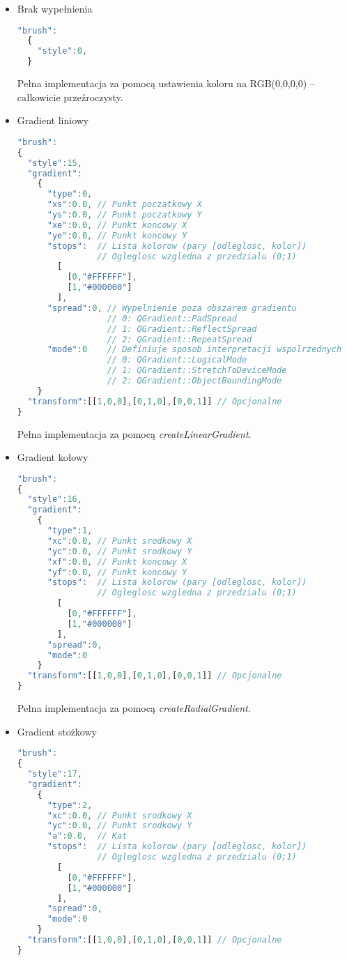 \begin{itemize}
\item Brak wypełnienia
\begin{lstlisting}[language=JavaScript,numbers=none]	    "brush":
  {
    "style":0,
  }
\end{lstlisting}

Pełna implementacja za pomocą ustawienia koloru na RGB(0,0,0,0) -- całkowicie przeźroczysty.

\item Gradient liniowy
\begin{lstlisting}[language=JavaScript,numbers=none]	    "brush":			
{
  "style":15,
  "gradient":
    {  
      "type":0,
      "xs":0.0, // Punkt poczatkowy X
      "ys":0.0, // Punkt poczatkowy Y
      "xe":0.0, // Punkt koncowy X
      "ye":0.0, // Punkt koncowy Y
      "stops":  // Lista kolorow (pary [odleglosc, kolor])
                // Ogleglosc wzgledna z przedzialu (0;1)
        [
          [0,"#FFFFFF"],
          [1,"#000000"]
        ],
      "spread":0, // Wypelnienie poza obszarem gradientu
                  // 0: QGradient::PadSpread
                  // 1: QGradient::ReflectSpread
                  // 2: QGradient::RepeatSpread
      "mode":0    // Definiuje sposob interpretacji wspolrzednych
                  // 0: QGradient::LogicalMode
                  // 1: QGradient::StretchToDeviceMode
                  // 2: QGradient::ObjectBoundingMode
    }
  "transform":[[1,0,0],[0,1,0],[0,0,1]] // Opcjonalne
}
\end{lstlisting}

Pełna implementacja za pomocą \emph{createLinearGradient}.

\item Gradient kołowy
\begin{lstlisting}[language=JavaScript,numbers=none]	    "brush":			
{
  "style":16,
  "gradient":
    {  
      "type":1,
      "xc":0.0, // Punkt srodkowy X
      "yc":0.0, // Punkt srodkowy Y
      "xf":0.0, // Punkt koncowy X
      "yf":0.0, // Punkt koncowy Y
      "stops":  // Lista kolorow (pary [odleglosc, kolor])
                // Ogleglosc wzgledna z przedzialu (0;1)
        [
          [0,"#FFFFFF"],
          [1,"#000000"]
        ],
      "spread":0,
      "mode":0
    }
  "transform":[[1,0,0],[0,1,0],[0,0,1]] // Opcjonalne
}
\end{lstlisting}

Pełna implementacja za pomocą \emph{createRadialGradient}.

\item Gradient stożkowy
\begin{lstlisting}[language=JavaScript,numbers=none]	    "brush":			
{
  "style":17,
  "gradient":
    {  
      "type":2,
      "xc":0.0, // Punkt srodkowy X
      "yc":0.0, // Punkt srodkowy Y
      "a":0.0,  // Kat
      "stops":  // Lista kolorow (pary [odleglosc, kolor])
                // Ogleglosc wzgledna z przedzialu (0;1)
        [
          [0,"#FFFFFF"],
          [1,"#000000"]
        ],
      "spread":0,
      "mode":0
    }
  "transform":[[1,0,0],[0,1,0],[0,0,1]] // Opcjonalne
}
\end{lstlisting}


\end{itemize}
